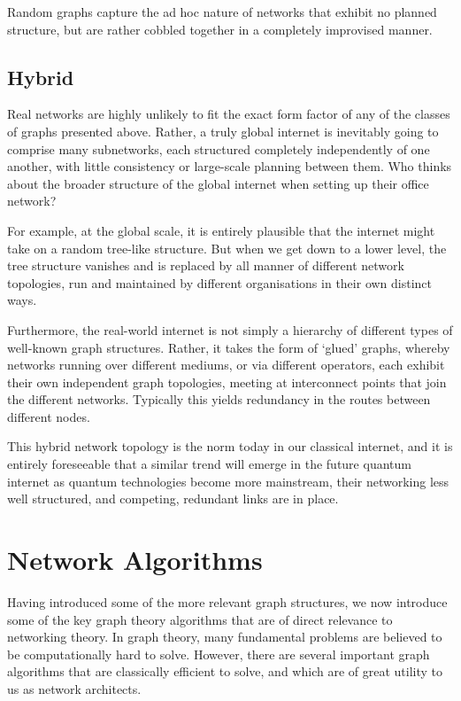 \documentclass[aps,rmp,twocolumn,amsmath,amssymb,nofootinbib,superscriptaddress]{revtex4}
\begin{document}
Random graphs capture the ad hoc nature of networks that exhibit no planned structure, but are rather cobbled together in a completely improvised manner.

%
%

\subsection{Hybrid}

Real networks are highly unlikely to fit the exact form factor of any of the classes of graphs presented above. Rather, a truly global internet is inevitably going to comprise many subnetworks, each structured completely independently of one another, with little consistency or large-scale planning between them. Who thinks about the broader structure of the global internet when setting up their office network?

For example, at the global scale, it is entirely plausible that the internet might take on a random tree-like structure. But when we get down to a lower level, the tree structure vanishes and is replaced by all manner of different network topologies, run and maintained by different organisations in their own distinct ways.

Furthermore, the real-world internet is not simply a hierarchy of different types of well-known graph structures. Rather, it takes the form of `glued' graphs, whereby networks running over different mediums, or via different operators, each exhibit their own independent graph topologies, meeting at interconnect points that join the different networks. Typically this yields redundancy in the routes between different nodes.

This hybrid network topology is the norm today in our classical internet, and it is entirely foreseeable that a similar trend will emerge in the future quantum internet as quantum technologies become more mainstream, their networking less well structured, and competing, redundant links are in place.

%
%

\section{Network Algorithms} \label{sec:graph_theory}

Having introduced some of the more relevant graph structures, we now introduce some of the key graph theory algorithms that are of direct relevance to networking theory. In graph theory, many fundamental problems are believed to be computationally hard to solve. However, there are several important graph algorithms that are classically efficient to solve, and which are of great utility to us as network architects.
\end{document}
